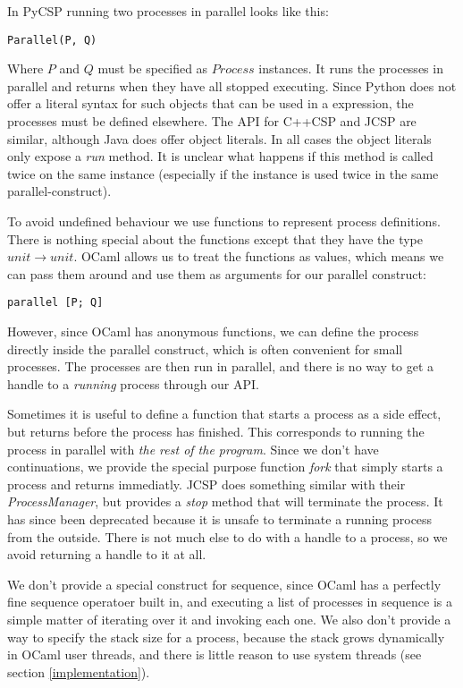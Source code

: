 \documentclass[a4paper,12pt]{article}
\begin{document}
In PyCSP running two processes in parallel looks like this:
\begin{verbatim}
Parallel(P, Q)
\end{verbatim}
Where $P$ and $Q$ must be specified as $Process$ instances. It runs the processes in
parallel and returns when they have all stopped executing. Since Python does not offer
a literal syntax for such objects that can be used in a expression, the processes must
be defined elsewhere. The API for C++CSP and JCSP are similar, although Java does offer
object literals. In all cases the object literals only expose a \emph{run} method. 
It is unclear what happens if this method is called twice on the same instance 
(especially if the instance is used twice in the same parallel-construct).

To avoid undefined behaviour we use functions to represent process definitions. There is 
nothing special about the functions except that they have the type $unit \to unit$. OCaml 
allows us to treat the functions as values, which means we can pass them around and use 
them as arguments for our parallel construct:

\begin{verbatim}
parallel [P; Q]
\end{verbatim}

However, since OCaml has anonymous functions, we can define the process directly inside
the parallel construct, which is often convenient for small processes. The processes
are then run in parallel, and there is no way to get a handle to a \emph{running} process
through our API.

Sometimes it is useful to define a function that starts a process as a side effect, but
returns before the process has finished. This corresponds to running the process in 
parallel with \emph{the rest of the program}. Since we don't have continuations, we 
provide the special purpose function \emph{fork} that simply starts a process and returns
immediatly. JCSP does something similar with their \emph{ProcessManager}, but provides a
\emph{stop} method that will terminate the process. It has since been deprecated because
it is unsafe to terminate a running process from the outside. There is not much else to 
do with a handle to a process, so we avoid returning a handle to it at all.

We don't provide a special construct for sequence, since OCaml has a perfectly fine 
sequence operatoer built in, and executing a list of processes in sequence is a simple
matter of iterating over it and invoking each one. We also don't provide a way to specify 
the stack size for a process, because the stack grows dynamically in OCaml user threads, 
and there is little reason to use system threads (see section \ref{implementation}).
\end{document}
